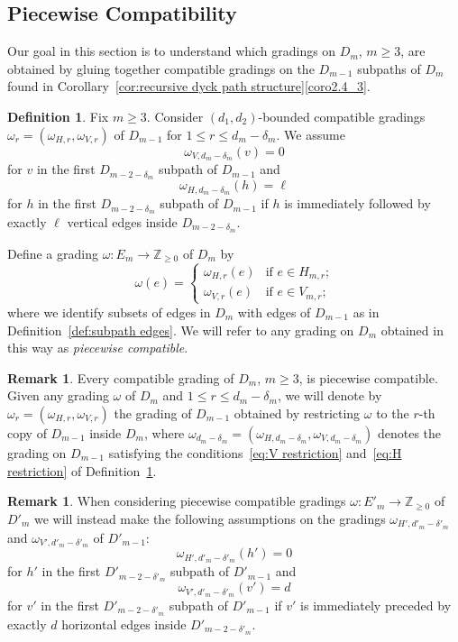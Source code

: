 \documentclass[10pt]{amsart}
\theoremstyle{definition}
\newtheorem{definition}[theorem]{Definition}
\newtheorem{remark}[theorem]{Remark}
\newcommand{\ZZ}{\mathbb{Z}}
\begin{document}
\subsection{Piecewise Compatibility}
\label{sec:piecewise compatibility}
Our goal in this section is to understand which gradings on $D_m$, $m\ge3$, are obtained by gluing together compatible gradings on the $D_{m-1}$ subpaths of $D_m$ found in Corollary~\ref{cor:recursive dyck path structure}\ref {coro2.4_3}.
\begin{definition}
 \label{def:agregate grading}
 Fix $m\ge3$. Consider $(d_1,d_2)$-bounded compatible gradings $\omega_r=(\omega_{H,r},\omega_{V,r})$ of $D_{m-1}$ for $1\le r\le d_m-\delta_m$. We assume
 \begin{equation}
 \label{eq:V restriction}
 \omega_{V,d_m-\delta_m}(v)=0
 \end{equation}
 for $v$ in the first $D_{m-2-\delta_m}$ subpath of $D_{m-1}$ and
 \begin{equation}
 \label{eq:H restriction}
 \omega_{H,d_m-\delta_m}(h)=\ell
 \end{equation}
 for $h$ in the first $D_{m-2-\delta_m}$ subpath of $D_{m-1}$ if $h$ is immediately followed by exactly $\ell$ vertical edges inside $D_{m-2-\delta_m}$. 

 Define a grading $\omega:E_m\to\ZZ_{\ge0}$ of $D_m$ by
 \[\omega(e)=\begin{cases}\omega_{H,r}(e) & \text{if $e\in H_{m,r}$;}\\ \omega_{V,r}(e) & \text{if $e\in V_{m,r}$;}\end{cases}\]
 where we identify subsets of edges in $D_m$ with edges of $D_{m-1}$ as in Definition~\ref{def:subpath edges}. We will refer to any grading on $D_m$ obtained in this way as \emph{piecewise compatible}.
\end{definition}
\begin{remark}
 \label{rem:restricted gradings}
 Every compatible grading of $D_m$, $m\ge3$, is piecewise compatible. 
 Given any grading $\omega$ of $D_m$ and $1\le r\le d_m-\delta_m$, we will denote by $\omega_r=(\omega_{H,r},\omega_{V,r})$ the grading of $D_{m-1}$ obtained by restricting $\omega$ to the $r$-th copy of $D_{m-1}$ inside $D_m$, where $\omega_{d_m-\delta_m}=(\omega_{H,d_m-\delta_m},\omega_{V,d_m-\delta_m})$ denotes the grading on $D_{m-1}$ satisfying the conditions~\eqref{eq:V restriction} and~\eqref{eq:H restriction} of Definition~\ref{def:agregate grading}.
\end{remark}
\begin{remark}
 \label{rem:alternate restrictions}
 When considering piecewise compatible gradings $\omega:E'_m\to\ZZ_{\ge0}$ of $D'_m$ we will instead make the following assumptions on the gradings $\omega_{H',d'_m-\delta'_m}$ and $\omega_{V',d'_m-\delta'_m}$ of $D'_{m-1}$:
 \[\omega_{H',d'_m-\delta'_m}(h')=0\]
 for $h'$ in the first $D'_{m-2-\delta'_m}$ subpath of $D'_{m-1}$ and
 \[\omega_{V',d'_m-\delta'_m}(v')=d\]
 for $v'$ in the first $D'_{m-2-\delta'_m}$ subpath of $D'_{m-1}$ if $v'$ is immediately preceded by exactly $d$ horizontal edges inside $D'_{m-2-\delta'_m}$. 
\end{remark}
\end{document}

